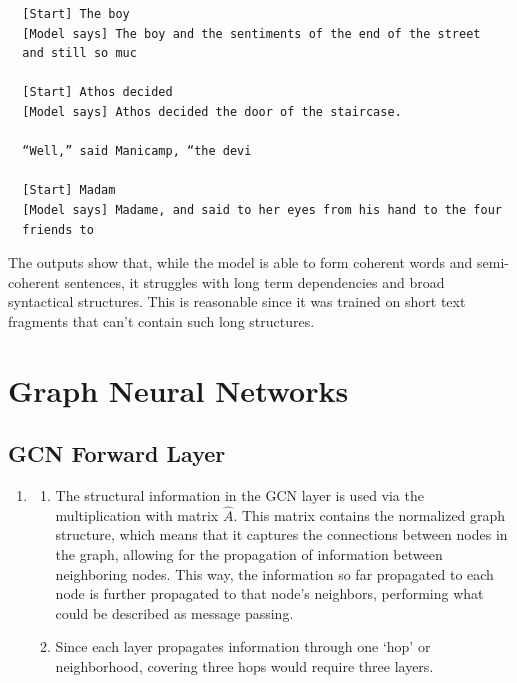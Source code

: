 \documentclass{article}
\begin{document}
\begin{enumerate}[label=\textbf{2.\arabic*}]
  \begin{verbatim}
  [Start] The boy
  [Model says] The boy and the sentiments of the end of the street
  and still so muc

  [Start] Athos decided
  [Model says] Athos decided the door of the staircase.

  “Well,” said Manicamp, “the devi

  [Start] Madam
  [Model says] Madame, and said to her eyes from his hand to the four
  friends to
  \end{verbatim}

  The outputs show that, while the model is able to form coherent words and semi-coherent sentences, it struggles with long term dependencies and broad syntactical structures. This is reasonable since it was trained on short text fragments that can't contain such long structures.
\end{enumerate}

\section{Graph Neural Networks}

\subsection{GCN Forward Layer}

\begin{enumerate}[label=\textbf{3.\arabic*}]
  \item

  \begin{enumerate}[label=\textbf{(\alph*)}]
    \item
    The structural information in the GCN layer is used via the multiplication with matrix $\hat{A}$. This matrix contains the normalized graph structure, which means that it captures the connections between nodes in the graph, allowing for the propagation of information between neighboring nodes. This way, the information so far propagated to each node is further propagated to that node's neighbors, performing what could be described as message passing.

    \item
    Since each layer propagates information through one `hop' or neighborhood, covering three hops would require three layers.
  \end{enumerate}
\end{enumerate}
\end{document}
